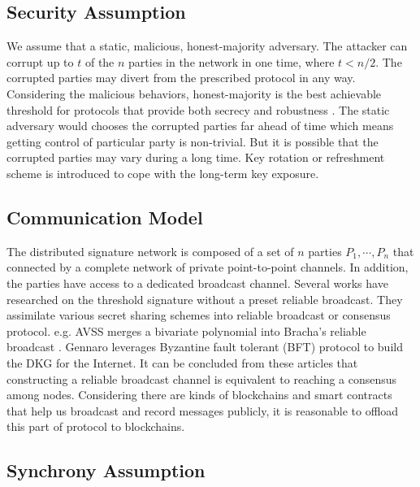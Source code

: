 \documentclass[11pt]{article}
\begin{document}
\subsection{Security Assumption}

We assume that a static, malicious, honest-majority adversary. The attacker can corrupt up to $t$ of the $n$ parties in the network in one time, where $t < n/2$. The corrupted parties may divert from the prescribed protocol in any way. Considering the malicious behaviors, honest-majority is the best achievable threshold for protocols that provide both secrecy and robustness \cite{gennaro2007secure}. The static adversary would chooses the corrupted parties far ahead of time which means getting control of particular party is non-trivial. But it is possible that the corrupted parties may vary during a long time. Key rotation or refreshment scheme is introduced to cope with the long-term key exposure.

\subsection{Communication Model}

The distributed signature network is composed of a set of $n$ parties $P_1, \cdots, P_n$ that connected by a complete network of private point-to-point channels. In addition, the parties have access to a dedicated broadcast channel. Several works\cite{kate2009distributed,kate2012distributed,cachin2002asynchronous} have researched on the threshold signature without a preset reliable broadcast. They assimilate various secret sharing schemes into reliable broadcast or consensus protocol. e.g. AVSS\cite{cachin2002asynchronous} merges a bivariate polynomial into Bracha’s reliable broadcast \cite{bracha1984asynchronous}. Gennaro\cite{gennaro2007secure} leverages Byzantine fault tolerant (BFT) protocol\cite{castro1999practical} to build the DKG for the Internet. It can be concluded from these articles that constructing a reliable broadcast channel is equivalent to reaching a consensus among nodes. Considering there are kinds of blockchains and smart contracts that help us broadcast and record messages publicly, it is reasonable to offload this part of protocol to blockchains.

\subsection{Synchrony Assumption}
\end{document}
